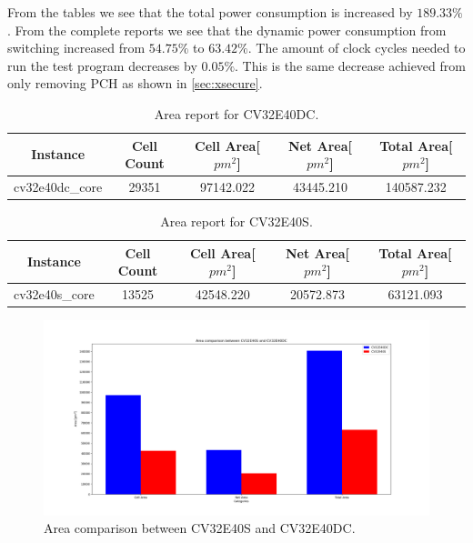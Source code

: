 From the tables we see that the total power consumption is increased by $189.33\%$.  From the complete reports we see that the dynamic power consumption from switching increased from $54.75\%$ to $63.42\%$. The amount of clock cycles needed to run the test program decreases by $0.05\%$. This is the same decrease achieved from only removing PCH as shown in \autoref{sec:xsecure}.

\begin{table}[h!]
\centering
\caption{Area report for CV32E40DC.}
\label{tab:cv32e40dc_area}
\begin{tabular}{c|cccc}
\toprule 
Instance & Cell Count & Cell Area[$pm^2$] & Net Area[$pm^2$] & Total Area[$pm^2$]\\
\midrule
\rowcolor{black!20} cv32e40dc\_core & 29351 & 97142.022 & 43445.210 & 140587.232\\
\bottomrule
\end{tabular}
\end{table}

\begin{table}[h!]
\centering
\caption{Area report for CV32E40S.}
\label{tab:cv32e40s_area}
\begin{tabular}{c|cccc}
\toprule 
Instance & Cell Count & Cell Area[$pm^2$] & Net Area[$pm^2$] & Total Area[$pm^2$]\\
\midrule
\rowcolor{black!20} cv32e40s\_core & 13525 & 42548.220 & 20572.873 & 63121.093\\
\bottomrule
\end{tabular}
\end{table}

\begin{figure}[h!]
    \centering
    \includegraphics[width=\textwidth]{docs/images/area_comparison.png}
    \caption{Area comparison between CV32E40S and CV32E40DC.}
    \label{fig:area_compare}
\end{figure}

